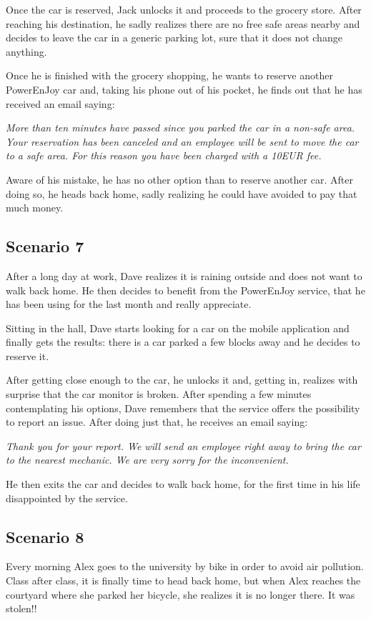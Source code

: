 Once the car is reserved, Jack unlocks it and proceeds to the grocery store. After reaching his destination, he sadly realizes there are no free safe areas nearby and decides to leave the car in a generic parking lot, sure that it does not change anything. 

Once he is finished with the grocery shopping, he wants to reserve another PowerEnJoy car and, taking his phone out of his pocket, he finds out that he has received an email saying: 

\textit{More than ten minutes have passed since you parked the car in a non-safe area. Your reservation has been canceled and an employee will be sent to move the car to a safe area. For this reason you have been charged with a 10EUR fee.}

Aware of his mistake, he has no other option than to reserve another car. After doing so, he heads back home, sadly realizing he could have avoided to pay that much money. 
\subsection{Scenario 7}
After a long day at work, Dave realizes it is raining outside and does not want to walk back home. He then decides to benefit from the PowerEnJoy service, that he has been using for the last month and really appreciate. 

Sitting in the hall, Dave starts looking for a car on the mobile application and finally gets the results: there is a car parked a few blocks away and he decides to reserve it. 

After getting close enough to the car, he unlocks it and, getting in, realizes with surprise that the car monitor is broken. After spending a few minutes contemplating his options, Dave remembers that the service offers the possibility to report an issue. After doing just that, he receives an email saying: 

\textit{Thank you for your report. We will send an employee right away to bring the car to the nearest mechanic. We are very sorry for the inconvenient.}

He then exits the car and decides to walk back home, for the first time in his life disappointed by the service.
\subsection{Scenario 8}
Every morning Alex goes to the university by bike in order to avoid air pollution. Class after class, it is finally time to head back home, but when Alex reaches the courtyard where she parked her bicycle, she realizes it is no longer there. It was stolen!! 

